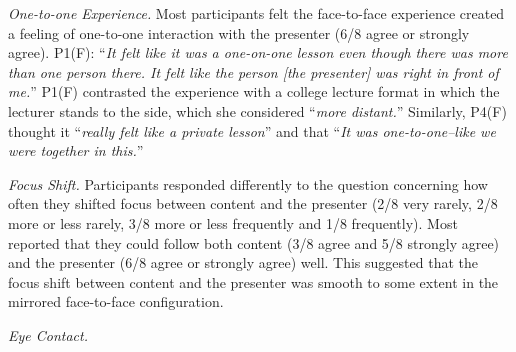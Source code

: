 \documentclass[sigchi-a]{acmart}
\begin{document}
\textit{One-to-one Experience.}
Most participants felt the face-to-face experience created a feeling of one-to-one interaction with the presenter (6/8 agree or strongly agree).
P1(F): ``\textit{It felt like it was a one-on-one lesson even though there was more than one person there. It felt like the person [the presenter] was right in front of me.}''
P1(F) contrasted the experience with a college lecture format in which the lecturer stands to the side, which she considered ``\textit{more distant.}'' 
Similarly, P4(F) thought it ``\textit{really felt like a private lesson}'' and that  ``\textit{It was one-to-one--like we were together in this.}''

\textit{Focus Shift.}
 Participants responded differently to the question concerning how often they shifted focus between content and the presenter (2/8 very rarely, 2/8 more or less rarely, 3/8 more or less frequently and 1/8 frequently).  Most reported that they could follow both content (3/8 agree and 5/8 strongly agree) and the presenter (6/8 agree or strongly agree) well. This suggested that the focus shift between content and the presenter was smooth to some extent in the mirrored face-to-face configuration.

\textit{Eye Contact.}
\end{document}
